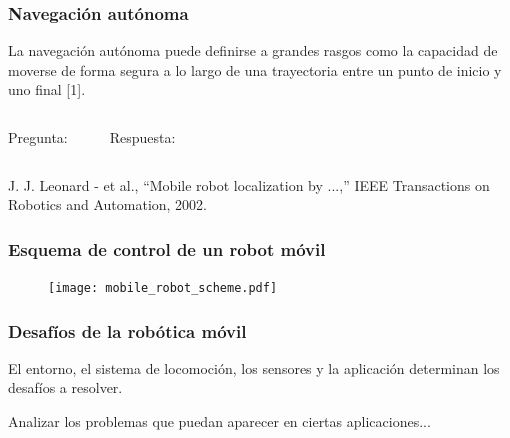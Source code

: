\begin{frame}
    \frametitle{Navegación autónoma}
    \begin{block}{}
        La navegación autónoma puede definirse a grandes rasgos como la capacidad de moverse de forma segura a lo largo de una trayectoria entre un punto de inicio y uno final [1].
    \end{block}
    \vspace{5mm}
    \footnotesize
    \begin{columns}[t]
        \hspace{13pt}Pregunta:
        \begin{enumerate}
        \end{enumerate}
        Respuesta:
        \begin{enumerate}[$\rightarrow$]
        \end{enumerate}
    \end{columns}
    \vfill
    \begin{tiny}
        [1] J. J. Leonard - et al., ``Mobile robot localization by ...,'' IEEE Transactions on Robotics and Automation, 2002.
    \end{tiny}
\end{frame}

\begin{frame}
    \frametitle{Esquema de control de un robot móvil}
    \begin{figure}[!h]
    	\texttt{[image: mobile\_robot\_scheme.pdf]}
    \end{figure}
\end{frame}

\begin{frame}
    \frametitle{Desafíos de la robótica móvil}

    El entorno, el sistema de locomoción, los sensores y la aplicación determinan los desafíos a resolver.

    \vspace{1em}

    Analizar los problemas que puedan aparecer en ciertas aplicaciones...

\end{frame}

